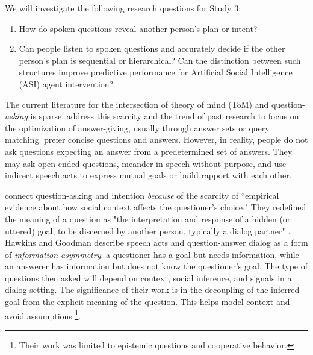 We will investigate the following research questions for Study 3:

\begin{enumerate}
    \item How do spoken questions reveal another person's plan or intent? 
    \item Can people listen to spoken questions and accurately decide if the
        other person's plan is sequential or hierarchical? Can the
        distinction between such structures improve predictive performance for
        Artificial Social Intelligence (ASI) agent intervention?
\end{enumerate}


The current literature for the intersection of theory of mind (ToM) and
question-\emph{asking} is sparse. \citet{hawkins_goodman_2017} address this
scarcity and the trend of past research to focus on the optimization of
answer-giving, usually through answer sets or query matching.  prefer concise
questions and answers. However, in reality, people do not ask questions
expecting an answer from a predetermined set of answers.
They may ask open-ended questions, meander in speech without
purpose, and use indirect speech acts to express mutual goals or build rapport
with each other. 

\cite{hawkins_goodman_2017} connect question-asking and intention
\emph{because} of the scarcity of ``empirical evidence about how social context
affects the questioner’s choice." They redefined the meaning of a question as
"the interpretation and response of a hidden (or uttered) goal, to be discerned
by another person, typically a dialog partner" \citep{hawkins_goodman_2017}.
Hawkins and Goodman describe speech acts and question-answer dialog as a form
of \emph{information asymmetry}: a questioner has a goal but needs information,
while an answerer has information but does not know the questioner’s goal. The
type of questions then asked will depend on context, social inference, and
signals in a dialog setting. The significance of their work is in the
decoupling of the inferred goal from the explicit meaning of the question. This
helps model context and avoid assumptions \footnote{Their work was limited to
epistemic questions and cooperative behavior.}.

